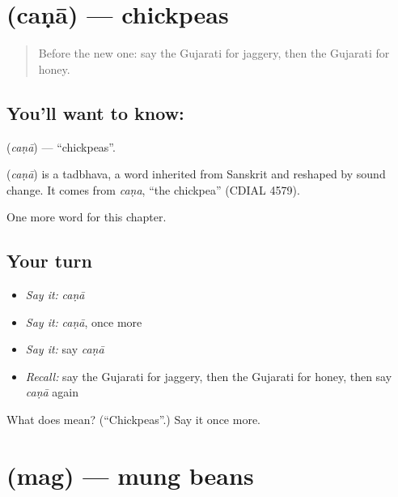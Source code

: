 \section[\texorpdfstring{\gu{ચણા} (caṇā)}{ચણા (caṇā)}]{ (caṇā) — chickpeas}

\label{lesson:GU-C113-cana}



\begin{quote}
Before the new one: say the Gujarati for jaggery, then the Gujarati for honey.
\end{quote}

\subsection*{You'll want to know: }
\textbf{} (\emph{caṇā}) — \textquotedblleft{}chickpeas\textquotedblright{}.

\begin{cousinweb}
\textbf{} (\emph{caṇā}) is a tadbhava, a word inherited from Sanskrit and reshaped by sound change. It comes from \emph{caṇa}, \textquotedblleft{}the chickpea\textquotedblright{} (CDIAL 4579).
\end{cousinweb}

\begin{grammarlens}[title={What you've built}]
One more word for this chapter.
\end{grammarlens}

\subsection*{Your turn}
\begin{itemize}
\raggedright
  \item \emph{Say it:} \emph{caṇā}
  \item \emph{Say it:} \emph{caṇā}, once more
  \item \emph{Say it:} say \emph{caṇā}
  \item \emph{Recall:} say the Gujarati for jaggery, then the Gujarati for honey, then say \emph{caṇā} again
\end{itemize}

\begin{tcolorbox}[breakable,colback=teal!4,colframe=teal!35!black,title={Before you move on}]
What does  mean? (\textquotedblleft{}Chickpeas\textquotedblright{}.) Say it once more.
\end{tcolorbox}
\section[\texorpdfstring{\gu{મગ} (mag)}{મગ (mag)}]{ (mag) — mung beans}

